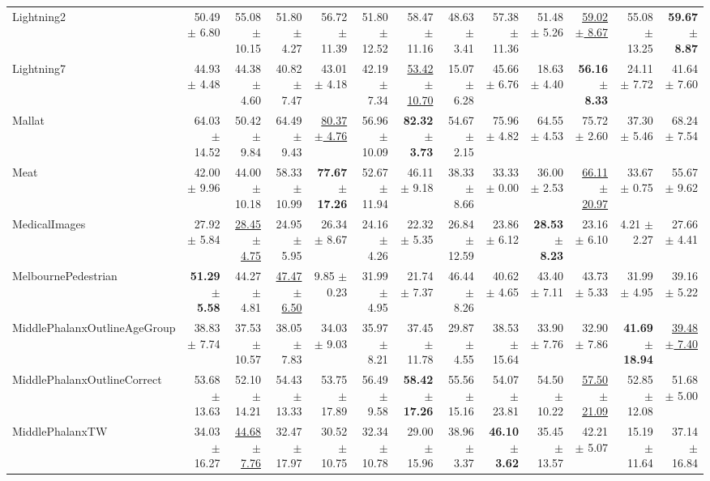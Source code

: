 \begin{landscape}
\begin{longtable}{lrrrrrrrrrrrr}
Lightning2 & 50.49 $\pm$ 6.80 & 55.08 $\pm$ 10.15 & 51.80 $\pm$ 4.27 & 56.72 $\pm$ 11.39 & 51.80 $\pm$ 12.52 & 58.47 $\pm$ 11.16 & 48.63 $\pm$ 3.41 & 57.38 $\pm$ 11.36 & 51.48 $\pm$ 5.26 & \underline{59.02 $\pm$ 8.67} & 55.08 $\pm$ 13.25 & \textbf{59.67 $\pm$ 8.87} \\
Lightning7 & 44.93 $\pm$ 4.48 & 44.38 $\pm$ 4.60 & 40.82 $\pm$ 7.47 & 43.01 $\pm$ 4.18 & 42.19 $\pm$ 7.34 & \underline{53.42 $\pm$ 10.70} & 15.07 $\pm$ 6.28 & 45.66 $\pm$ 6.76 & 18.63 $\pm$ 4.40 & \textbf{56.16 $\pm$ 8.33} & 24.11 $\pm$ 7.72 & 41.64 $\pm$ 7.60 \\
Mallat & 64.03 $\pm$ 14.52 & 50.42 $\pm$ 9.84 & 64.49 $\pm$ 9.43 & \underline{80.37 $\pm$ 4.76} & 56.96 $\pm$ 10.09 & \textbf{82.32 $\pm$ 3.73} & 54.67 $\pm$ 2.15 & 75.96 $\pm$ 4.82 & 64.55 $\pm$ 4.53 & 75.72 $\pm$ 2.60 & 37.30 $\pm$ 5.46 & 68.24 $\pm$ 7.54 \\
Meat & 42.00 $\pm$ 9.96 & 44.00 $\pm$ 10.18 & 58.33 $\pm$ 10.99 & \textbf{77.67 $\pm$ 17.26} & 52.67 $\pm$ 11.94 & 46.11 $\pm$ 9.18 & 38.33 $\pm$ 8.66 & 33.33 $\pm$ 0.00 & 36.00 $\pm$ 2.53 & \underline{66.11 $\pm$ 20.97} & 33.67 $\pm$ 0.75 & 55.67 $\pm$ 9.62 \\
MedicalImages & 27.92 $\pm$ 5.84 & \underline{28.45 $\pm$ 4.75} & 24.95 $\pm$ 5.95 & 26.34 $\pm$ 8.67 & 24.16 $\pm$ 4.26 & 22.32 $\pm$ 5.35 & 26.84 $\pm$ 12.59 & 23.86 $\pm$ 6.12 & \textbf{28.53 $\pm$ 8.23} & 23.16 $\pm$ 6.10 & 4.21 $\pm$ 2.27 & 27.66 $\pm$ 4.41 \\
MelbournePedestrian & \textbf{51.29 $\pm$ 5.58} & 44.27 $\pm$ 4.81 & \underline{47.47 $\pm$ 6.50} & 9.85 $\pm$ 0.23 & 31.99 $\pm$ 4.95 & 21.74 $\pm$ 7.37 & 46.44 $\pm$ 8.26 & 40.62 $\pm$ 4.65 & 43.40 $\pm$ 7.11 & 43.73 $\pm$ 5.33 & 31.99 $\pm$ 4.95 & 39.16 $\pm$ 5.22 \\
MiddlePhalanxOutlineAgeGroup & 38.83 $\pm$ 7.74 & 37.53 $\pm$ 10.57 & 38.05 $\pm$ 7.83 & 34.03 $\pm$ 9.03 & 35.97 $\pm$ 8.21 & 37.45 $\pm$ 11.78 & 29.87 $\pm$ 4.55 & 38.53 $\pm$ 15.64 & 33.90 $\pm$ 7.76 & 32.90 $\pm$ 7.86 & \textbf{41.69 $\pm$ 18.94} & \underline{39.48 $\pm$ 7.40} \\
MiddlePhalanxOutlineCorrect & 53.68 $\pm$ 13.63 & 52.10 $\pm$ 14.21 & 54.43 $\pm$ 13.33 & 53.75 $\pm$ 17.89 & 56.49 $\pm$ 9.58 & \textbf{58.42 $\pm$ 17.26} & 55.56 $\pm$ 15.16 & 54.07 $\pm$ 23.81 & 54.50 $\pm$ 10.22 & \underline{57.50 $\pm$ 21.09} & 52.85 $\pm$ 12.08 & 51.68 $\pm$ 5.00 \\
MiddlePhalanxTW & 34.03 $\pm$ 16.27 & \underline{44.68 $\pm$ 7.76} & 32.47 $\pm$ 17.97 & 30.52 $\pm$ 10.75 & 32.34 $\pm$ 10.78 & 29.00 $\pm$ 15.96 & 38.96 $\pm$ 3.37 & \textbf{46.10 $\pm$ 3.62} & 35.45 $\pm$ 13.57 & 42.21 $\pm$ 5.07 & 15.19 $\pm$ 11.64 & 37.14 $\pm$ 16.84 \\

\end{longtable}
\end{landscape}
